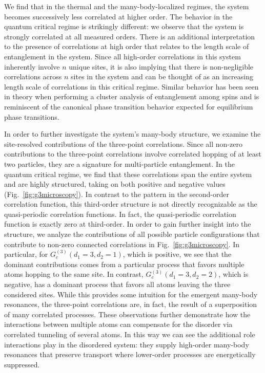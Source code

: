 We find that in the thermal and the many-body-localized regimes, the system becomes successively less correlated at higher order. The behavior in the quantum critical regime is strikingly different: we observe that the system is strongly correlated at all measured orders. There is an additional interpretation to the presence of correlations at high order that relates to the length scale of entanglement in the system. Since all high-order correlations in this system inherently involve $n$ unique sites, it is also implying that there is non-negligible correlations across $n$ sites in the system and can be thought of as an increasing length scale of correlations in this critical regime. Similar behavior has been seen in theory when performing a cluster analysis of entanglement among spins \cite{Herviou2019} and is reminiscent of the canonical phase transition behavior expected for equilibrium phase transitions\cite{Amico2008, Osterloh2002,Osborne2002}.

In order to further investigate the system's many-body structure, we examine the site-resolved contributions of the three-point correlations. Since all non-zero contributions to the three-point correlations involve correlated hopping of at least two particles, they are a signature for multi-particle entanglement\cite{Schweigler2017}.  In the quantum critical regime, we find that these correlations span the entire system and are highly structured, taking on both positive and negative values (Fig.~\ref{fig:g3microscopy}). In contrast to the pattern in the second-order correlation function, this third-order structure is not directly recognizable as the quasi-periodic correlation functions. In fact, the quasi-periodic correlation function is exactly zero at third-order. In order to gain further insight into the structure, we analyze the contributions of all possible particle configurations that contribute to non-zero connected correlations in Fig.~\ref{fig:g3microscopy}. In particular, for $G^{(3)}_c(d_1=3,d_2=1)$, which is positive, we see that the dominant contributions comes from a particular process that favors multiple atoms hopping to the same site. In contrast, $G^{(3)}_c(d_1=3,d_2=2)$, which is negative, has a dominant process that favors all atoms leaving the three considered sites. While this provides some intuition for the emergent many-body resonances, the three-point correlations are, in fact, the result of a superposition of many correlated processes. These observations further demonstrate how the interactions between multiple atoms can compensate for the disorder via correlated tunneling of several atoms. In this way we can see the additional role interactions play in the disordered system: they supply high-order many-body resonances that preserve transport where lower-order processes are energetically suppressed.

